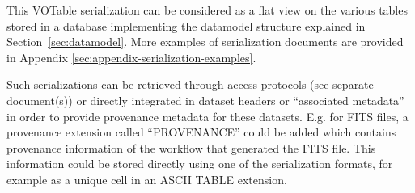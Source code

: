 This VOTable serialization can be considered as a flat view on the various tables stored in a database implementing the datamodel structure explained in Section~\ref{sec:datamodel}.
More examples of serialization documents are provided in Appendix \ref{sec:appendix-serialization-examples}.

Such serializations can be retrieved through access protocols (see separate document(s))%
 or directly integrated in dataset headers or ``associated metadata'' in order to provide provenance metadata for these datasets. E.g. for FITS files, a provenance extension called ``PROVENANCE'' could be added which contains provenance information of the workflow that generated the FITS file. This information could be stored directly using one of the serialization formats, for example as a unique cell in an ASCII TABLE extension.


